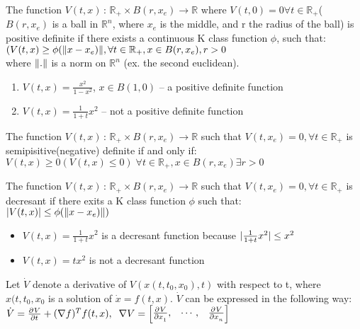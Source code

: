 {
    The function $V(t,x)\,:\,\mathbb{R}_+ \times B(r,x_e) \longrightarrow \mathbb{R}$ where $V(t,0) = 0 \forall t \in \mathbb{R}_+ $( $B(r,x_e )$ is a ball in $\mathbb{R}^{n}$, where $x_e$ is the middle, and r the radius of the ball) is positive definite if there exists a continuous K class function $\phi $, such that:\\
    $(V(t,x) \ge \phi(\lVert x-x_e)\rVert, \forall t \in \mathbb{R}_+, x \in B(r,x_e), r > 0$ \\
    where $\lVert.\rVert$ is a norm on $\mathbb{R}^{n}$ (ex. the second euclidean). 
    \ex{}
    {
        \begin{enumerate}
            \item $V(t,x) = \frac{x^{2}}{1-x^{2}}$, $x \in B(1,0)$ -- a positive definite function
            \item $V(t,x) = \frac{1}{1+t}x^{2}$ -- not a positive definite function
        \end{enumerate}
    }
}
{
    The function $V(t,x)\,:\,\mathbb{R}_+\times B(r,x_e) \longrightarrow  \mathbb{R} $ such that $V(t,x_e) = 0, \forall t \in  \mathbb{R}_+ $ is semipisitive(negative) definite if and only if:\\
    $V(t,x) \ge 0 (V(t,x) \le 0) \; \forall t \in \mathbb{R}_+, x\in B(r,x_e) \exists r >0 $
}
{
    The function $V(t,x)\,:\,\mathbb{R}_+\times B(r,x_e) \longrightarrow  \mathbb{R} $ such that $V(t,x_e) = 0, \forall t \in  \mathbb{R}_+ $ is decresant if there exits a K class function $\phi $ such that:\\
    $\lvert V(t,x)\rvert \le \phi (\lVert x-x_e)\rVert)$

    \ex{}
    {
        \begin{itemize}
            \item $V(t,x) = \frac{1}{1+t}x^{2} $ is a decresant function because $\lvert \frac{1}{1+t}x^{2}\rvert\le x^{2}$
            \item $V(t,x) = tx^{2}$ is not a decresant function
                
        \end{itemize}
    }
    
}
\nt
{
    Let $\dot{V}$ denote a derivative of $V(x(t,t_0,x_0),t)$ with respect to t, where $x(t,t_0,x_0$ is a solution of $\dot{x} = f(t,x)$. $\dot{V}$ can be expressed in the following way:\\
    $\dot{V} = \frac{\partial^{}V}{\partial t^{}} + (\nabla f)^{T}f(t,x),\; \; \nabla V = \begin{bmatrix}
        \frac{\partial^{}V}{\partial x_1^{}}, & \cdots, & \frac{\partial^{}V}{\partial x_n^{}}  
    \end{bmatrix}$
}
